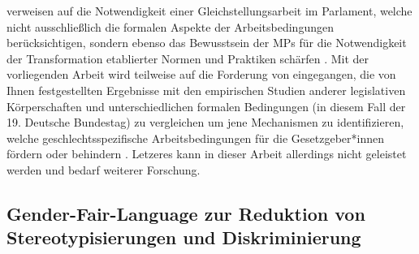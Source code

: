 \documentclass[12pt, 
    twoside=false, 
    bibliography=totoc, 
    numbers=endperiod, 
    headings=normal, 
    toc=chapterentrydotfill
    ]{scrbook}
\begin{document}
\citeauthor{erikson_2018} verweisen auf die Notwendigkeit einer Gleichstellungsarbeit im Parlament, welche nicht ausschließlich die formalen Aspekte der Arbeitsbedingungen berücksichtigen, sondern ebenso das Bewusstsein der MPs für die Notwendigkeit der Transformation etablierter Normen und Praktiken schärfen \parencite[211]{erikson_2018}.
Mit der vorliegenden Arbeit wird teilweise auf die Forderung von\citeauthor{erikson_2018} eingegangen, die von Ihnen festgestellten Ergebnisse mit den empirischen Studien anderer legislativen Körperschaften und unterschiedlichen formalen Bedingungen (in diesem Fall der 19. Deutsche Bundestag) zu vergleichen um jene Mechanismen zu identifizieren, welche geschlechtsspezifische Arbeitsbedingungen für die Gesetzgeber*innen fördern oder behindern \parencite[211]{erikson_2018}. Letzeres kann in dieser Arbeit allerdings nicht geleistet werden und bedarf weiterer Forschung. 

\subsection{Gender-Fair-Language zur Reduktion von Stereotypisierungen und Diskriminierung}\label{kapitel:gfl-studien}

\end{document}
